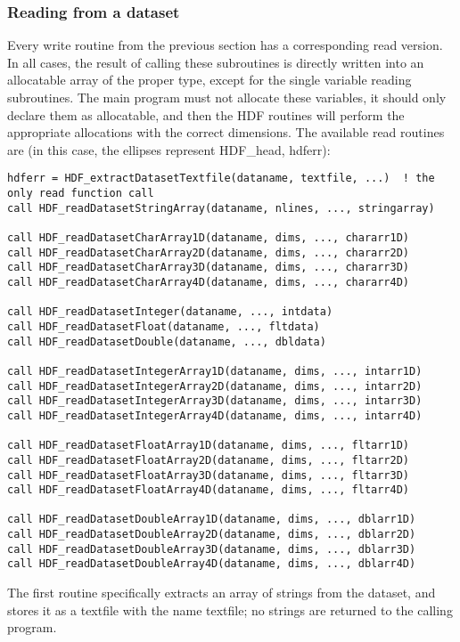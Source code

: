 \documentclass[DIV=calc, paper=letter, fontsize=11pt]{scrartcl}	 %
\begin{document}
\subsubsection{Reading from a dataset}
Every write routine from the previous section has a corresponding read version.  In 
all cases, the result of calling these subroutines is directly written into an allocatable 
array of the proper type, except for the single variable reading subroutines.  
The main program must not allocate these variables, it should
only declare them as allocatable, and then the HDF routines will perform the appropriate
allocations with the correct dimensions. The available read routines are (in this case, the ellipses
represent  \textsf{HDF\_head, hdferr}):
\begin{verbatim}
hdferr = HDF_extractDatasetTextfile(dataname, textfile, ...)  ! the only read function call 
call HDF_readDatasetStringArray(dataname, nlines, ..., stringarray)

call HDF_readDatasetCharArray1D(dataname, dims, ..., chararr1D) 
call HDF_readDatasetCharArray2D(dataname, dims, ..., chararr2D) 
call HDF_readDatasetCharArray3D(dataname, dims, ..., chararr3D) 
call HDF_readDatasetCharArray4D(dataname, dims, ..., chararr4D) 

call HDF_readDatasetInteger(dataname, ..., intdata)
call HDF_readDatasetFloat(dataname, ..., fltdata)
call HDF_readDatasetDouble(dataname, ..., dbldata) 

call HDF_readDatasetIntegerArray1D(dataname, dims, ..., intarr1D) 
call HDF_readDatasetIntegerArray2D(dataname, dims, ..., intarr2D) 
call HDF_readDatasetIntegerArray3D(dataname, dims, ..., intarr3D) 
call HDF_readDatasetIntegerArray4D(dataname, dims, ..., intarr4D) 

call HDF_readDatasetFloatArray1D(dataname, dims, ..., fltarr1D) 
call HDF_readDatasetFloatArray2D(dataname, dims, ..., fltarr2D) 
call HDF_readDatasetFloatArray3D(dataname, dims, ..., fltarr3D) 
call HDF_readDatasetFloatArray4D(dataname, dims, ..., fltarr4D) 

call HDF_readDatasetDoubleArray1D(dataname, dims, ..., dblarr1D)
call HDF_readDatasetDoubleArray2D(dataname, dims, ..., dblarr2D)
call HDF_readDatasetDoubleArray3D(dataname, dims, ..., dblarr3D)
call HDF_readDatasetDoubleArray4D(dataname, dims, ..., dblarr4D)
\end{verbatim}
The first routine specifically extracts an array of strings from the dataset, and
stores it as a textfile with the name \textsf{textfile}; no strings are returned to the 
calling program.
\end{document}
